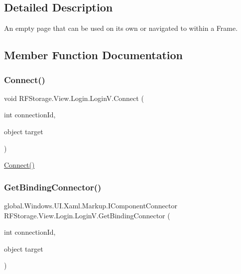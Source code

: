 \subsection{Detailed Description}
An empty page that can be used on its own or navigated to within a Frame. 



\subsection{Member Function Documentation}
\mbox{\label{class_r_f_storage_1_1_view_1_1_login_1_1_login_v_ab6558171bc0022b0ab89e823ea03313b}} 
\subsubsection{\texorpdfstring{Connect()}{Connect()}}
{\footnotesize\ttfamily void R\+F\+Storage.\+View.\+Login.\+Login\+V.\+Connect (\begin{DoxyParamCaption}\item[{int}]{connection\+Id,  }\item[{object}]{target }\end{DoxyParamCaption})}



\mbox{\hyperlink{class_r_f_storage_1_1_view_1_1_login_1_1_login_v_ab6558171bc0022b0ab89e823ea03313b}{Connect()}} 

\mbox{\label{class_r_f_storage_1_1_view_1_1_login_1_1_login_v_a163882764068d01be363bbdc0dc278cd}} 
\subsubsection{\texorpdfstring{GetBindingConnector()}{GetBindingConnector()}}
{\footnotesize\ttfamily global.\+Windows.\+U\+I.\+Xaml.\+Markup.\+I\+Component\+Connector R\+F\+Storage.\+View.\+Login.\+Login\+V.\+Get\+Binding\+Connector (\begin{DoxyParamCaption}\item[{int}]{connection\+Id,  }\item[{object}]{target }\end{DoxyParamCaption})}



